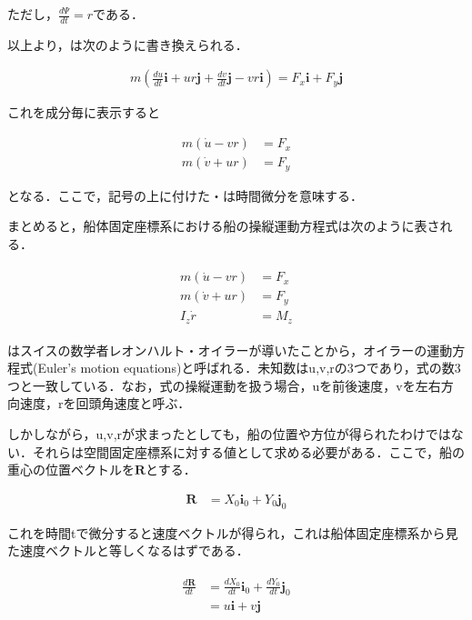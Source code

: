 ただし，$\frac{d\Psi}{d t}=r$である．

以上より，は次のように書き換えられる．

\begin{align}
    m\left(\frac{d u}{d t} \boldsymbol{i}+u r \boldsymbol{j}+\frac{d v}{d t} \boldsymbol{j}-v r \boldsymbol{i}\right)=F_{x} \boldsymbol{i}+F_{y} \boldsymbol{j} \label{eq:2-10}
\end{align}

これを成分毎に表示すると

\begin{align}
    m(\dot{u} - vr) &= F_x \label{eq:2-11}\\
    m(\dot{v} + ur) &= F_y \label{eq:2-12}
\end{align}

となる．ここで，記号の上に付けた・は時間微分を意味する．

まとめると，船体固定座標系における船の操縦運動方程式は次のように表される．

\begin{align}
    \begin{split}
        m(\dot{u} - v r) &= F_x \\
        m(\dot{v} + u r) &= F_y \\
        I_z \dot{r} &= M_z \label{eq:2-13}
    \end{split}
\end{align}

はスイスの数学者レオンハルト・オイラーが導いたことから，オイラーの運動方程式(Euler’s motion equations)と呼ばれる．未知数はu,v,rの3つであり，式の数3つと一致している．なお，式の操縦運動を扱う場合，uを前後速度，vを左右方向速度，rを回頭角速度と呼ぶ．

しかしながら，u,v,rが求まったとしても，船の位置や方位が得られたわけではない．それらは空間固定座標系に対する値として求める必要がある．ここで，船の重心の位置ベクトルを$\boldsymbol{R}$とする．

\begin{align}
    \boldsymbol{R} &= X_0 \boldsymbol{i}_0 + Y_0 \boldsymbol{j}_0 \label{eq:2-14}
\end{align}

これを時間tで微分すると速度ベクトルが得られ，これは船体固定座標系から見た速度ベクトルと等しくなるはずである．

\begin{align}
    \begin{split}
        \frac{d \boldsymbol{R}}{d t} &=\frac{d X_{0}}{d t} \boldsymbol{i}_{0}+\frac{d Y_{0}}{d t} \boldsymbol{j}_{0} \\
        &=u \boldsymbol{i}+v \boldsymbol{j} \label{eq:2-15}
    \end{split}
\end{align}

